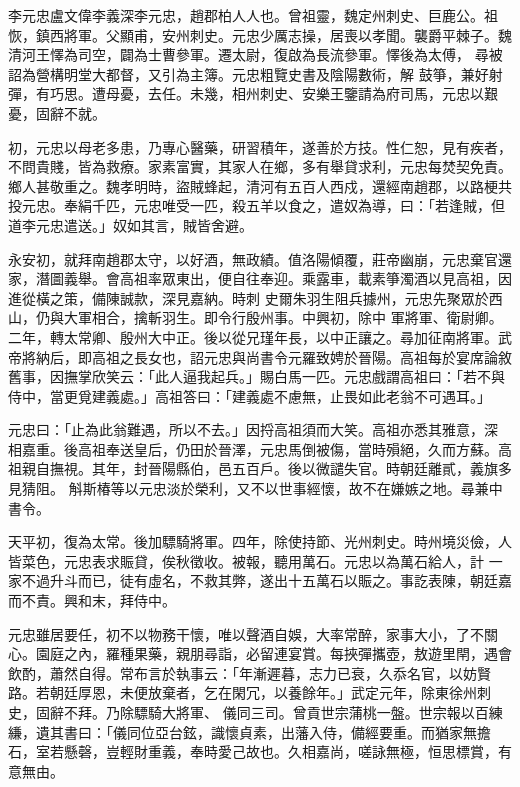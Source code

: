 
\begin{pinyinscope}

 李元忠盧文偉李義深李元忠，趙郡柏人人也。曾祖靈，魏定州刺史、巨鹿公。祖恢，鎮西將軍。父顯甫，安州刺史。元忠少厲志操，居喪以孝聞。襲爵平棘子。魏清河王懌為司空，闢為士曹參軍。遷太尉，復啟為長流參軍。懌後為太傅，
 尋被詔為營構明堂大都督，又引為主簿。元忠粗覽史書及陰陽數術，解
 鼓箏，兼好射彈，有巧思。遭母憂，去任。未幾，相州刺史、安樂王鑒請為府司馬，元忠以艱憂，固辭不就。



 初，元忠以母老多患，乃專心醫藥，研習積年，遂善於方技。性仁恕，見有疾者，不問貴賤，皆為救療。家素富實，其家人在鄉，多有舉貸求利，元忠每焚契免責。鄉人甚敬重之。魏孝明時，盜賊蜂起，清河有五百人西戍，還經南趙郡，以路梗共投元忠。奉絹千匹，元忠唯受一匹，殺五羊以食之，遣奴為導，曰：「若逢賊，但道李元忠遣送。」奴如其言，賊皆舍避。



 永安初，就拜南趙郡太守，以好酒，無政績。值洛陽傾覆，莊帝幽崩，元忠棄官還家，潛圖義舉。會高祖率眾東出，便自往奉迎。乘露車，載素箏濁酒以見高祖，因
 進從橫之策，備陳誠款，深見嘉納。時刺
 史爾朱羽生阻兵據州，元忠先聚眾於西山，仍與大軍相合，擒斬羽生。即令行殷州事。中興初，除中
 軍將軍、衛尉卿。二年，轉太常卿、殷州大中正。後以從兄瑾年長，以中正讓之。尋加征南將軍。武帝將納后，即高祖之長女也，詔元忠與尚書令元羅致娉於晉陽。高祖每於宴席論敘舊事，因撫掌欣笑云：「此人逼我起兵。」賜白馬一匹。元忠戲謂高祖曰：「若不與侍中，當更覓建義處。」高祖答曰：「建義處不慮無，止畏如此老翁不可遇耳。」



 元忠曰：「止為此翁難遇，所以不去。」因捋高祖須而大笑。高祖亦悉其雅意，深
 相嘉重。後高祖奉送皇后，仍田於晉澤，元忠馬倒被傷，當時殞絕，久而方蘇。高祖親自撫視。其年，封晉陽縣伯，邑五百戶。後以微譴失官。時朝廷離貳，義旗多見猜阻。
 斛斯椿等以元忠淡於榮利，又不以世事經懷，故不在嫌嫉之地。尋兼中書令。



 天平初，復為太常。後加驃騎將軍。四年，除使持節、光州刺史。時州境災儉，人皆菜色，元忠表求賑貸，俟秋徵收。被報，聽用萬石。元忠以為萬石給人，計
 一家不過升斗而已，徒有虛名，不救其弊，遂出十五萬石以賑之。事訖表陳，朝廷嘉而不責。興和末，拜侍中。



 元忠雖居要任，初不以物務干懷，唯以聲酒自娛，大率常醉，家事大小，了不關心。園庭之內，羅種果藥，親朋尋詣，必留連宴賞。每挾彈攜壺，敖遊里閈，遇會飲酌，蕭然自得。常布言於執事云：「年漸遲暮，志力已衰，久忝名官，以妨賢路。若朝廷厚恩，未便放棄者，乞在閑冗，以養餘年。」武定元年，除東徐州刺史，固辭不拜。乃除驃騎大將軍、
 儀同三司。曾貢世宗蒲桃一盤。世宗報以百練縑，遺其書曰：「儀同位亞台鉉，識懷貞素，出藩入侍，備經要重。而猶家無擔石，室若懸磬，豈輕財重義，奉時愛己故也。久相嘉尚，嗟詠無極，恒思標賞，有意無由。




\end{pinyinscope}
